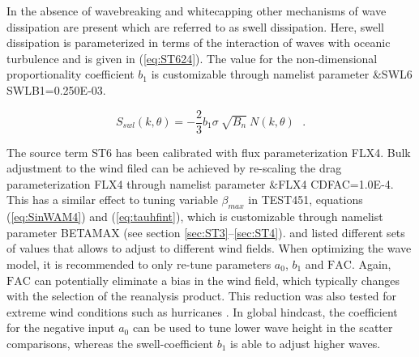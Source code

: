 In the absence of wavebreaking and whitecapping other mechanisms of wave
dissipation are present which are referred to as swell dissipation. Here,
swell dissipation is parameterized in terms of the interaction of waves with
oceanic turbulence \citep{bk:Bab11} and is given in (\ref{eq:ST624}). The
value for the non-dimensional proportionality coefficient $b_1$ is
customizable through namelist parameter {\code \&SWL6 SWLB1=0.250E-03}.

\begin{equation}\label{eq:ST624}
  S_{swl}(k,\theta) = -\frac{2}{3}b_1 \sigma\ \sqrt{B_n}\ N(k,\theta) \:\:\:.
\end{equation}

\noindent
The source term {\code ST6} has been calibrated with flux parameterization
{\code FLX4}. Bulk adjustment to the wind filed can be achieved by re-scaling
the drag parameterization {\code FLX4} through namelist parameter {\code
\&FLX4 CDFAC=1.0E-4}.  This has a similar effect to tuning variable
$\beta_{max}$ in TEST451, equations (\ref{eq:SinWAM4}) and
(\ref{eq:tauhfint}), which is customizable through namelist parameter {\code
BETAMAX} (see section \ref{sec:ST3}--\ref{sec:ST4}). \citet{pro:Aea11} and
\citet{art:RA13} listed different sets of values that allows to adjust to
different wind fields. When optimizing the wave model, it is recommended to
only re-tune parameters $a_0$, $b_1$ and $\mathrm{FAC}$. Again, $\mathrm{FAC}$
can potentially eliminate a bias in the wind field, which typically changes
with the selection of the reanalysis product. This reduction was also tested
for extreme wind conditions such as hurricanes \citep{art:ZBRY13}.  In global
hindcast, the coefficient for the negative input $a_0$ can be used to tune
lower wave height in the scatter comparisons, whereas the swell-coefficient
$b_1$ is able to adjust higher waves.

